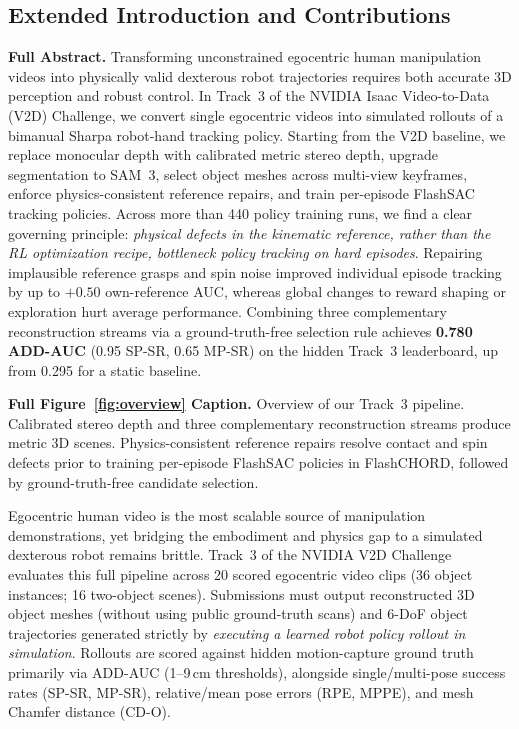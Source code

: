 \documentclass[10pt]{nvidiaextabstract}
\begin{document}
\subsection{Extended Introduction and Contributions}
\label{app:detail-intro}
\textbf{Full Abstract.} Transforming unconstrained egocentric human manipulation videos into physically valid dexterous robot trajectories requires both accurate 3D perception and robust control. In Track~3 of the NVIDIA Isaac Video-to-Data (V2D) Challenge, we convert single egocentric videos into simulated rollouts of a bimanual Sharpa robot-hand tracking policy. Starting from the V2D baseline, we replace monocular depth with calibrated metric stereo depth, upgrade segmentation to SAM~3, select object meshes across multi-view keyframes, enforce physics-consistent reference repairs, and train per-episode FlashSAC tracking policies. Across more than 440 policy training runs, we find a clear governing principle: \emph{physical defects in the kinematic reference, rather than the RL optimization recipe, bottleneck policy tracking on hard episodes}. Repairing implausible reference grasps and spin noise improved individual episode tracking by up to $+0.50$ own-reference AUC, whereas global changes to reward shaping or exploration hurt average performance. Combining three complementary reconstruction streams via a ground-truth-free selection rule achieves \textbf{0.780 ADD-AUC} (0.95 SP-SR, 0.65 MP-SR) on the hidden Track~3 leaderboard, up from 0.295 for a static baseline.

\textbf{Full Figure~\ref{fig:overview} Caption.} Overview of our Track~3 pipeline. Calibrated stereo depth and three complementary reconstruction streams produce metric 3D scenes. Physics-consistent reference repairs resolve contact and spin defects prior to training per-episode FlashSAC policies in FlashCHORD, followed by ground-truth-free candidate selection.

Egocentric human video is the most scalable source of manipulation demonstrations, yet bridging the embodiment and physics gap to a simulated dexterous robot remains brittle. Track~3 of the NVIDIA V2D Challenge~\cite{v2d,v2ddata} evaluates this full pipeline across 20 scored egocentric video clips (36 object instances; 16 two-object scenes). Submissions must output reconstructed 3D object meshes (without using public ground-truth scans) and 6-DoF object trajectories generated strictly by \emph{executing a learned robot policy rollout in simulation}. Rollouts are scored against hidden motion-capture ground truth primarily via ADD-AUC (1--9\,cm thresholds), alongside single/multi-pose success rates (SP-SR, MP-SR), relative/mean pose errors (RPE, MPPE), and mesh Chamfer distance (CD-O).
\end{document}
